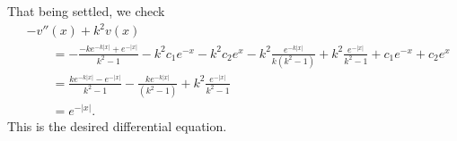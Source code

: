 \documentclass[11pt]{article}
\begin{document}
\begin{solution}
\begin{itemize}
    That being settled, we check 
    \begin{align*}
        &
        - v''(x) + k^{2} v(x)
        \\&\qquad 
        =
        -
        \frac{ - k e^{-k|x|} + e^{-|x|} }{ k^{2}-1 }
        - 
        k^{2} c_1 e^{-x} 
        - 
        k^{2} c_2 e^{x}
        -
        k^{2} \frac{ e^{-k|x|} }{ k (k^2-1) } 
        + 
        k^{2} \frac{ e^{-|x|} }{ k^2-1 } 
        + 
        c_1 e^{-x} 
        + 
        c_2 e^{x}
        \\&\qquad 
        =
        \frac{ k e^{-k|x|} - e^{-|x|} }{ k^{2}-1 }
        - 
        \frac{ k e^{-k|x|} }{ (k^2-1) } 
        + 
        k^{2} \frac{ e^{-|x|} }{ k^2-1 } 
        \\&\qquad 
        =
        e^{-|x|}
        .
    \end{align*}
    This is the desired differential equation. 
    \end{itemize}

\end{solution}
\end{document}
